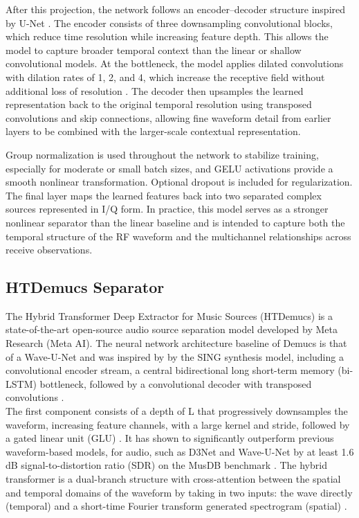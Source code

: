 \documentclass[conference]{IEEEtran}
\begin{document}
After this projection, the network follows an encoder--decoder structure inspired by U-Net \cite{ronneberger2015unet}. The encoder consists of three downsampling convolutional blocks, which reduce time resolution while increasing feature depth. This allows the model to capture broader temporal context than the linear or shallow convolutional models. At the bottleneck, the model applies dilated convolutions with dilation rates of 1, 2, and 4, which increase the receptive field without additional loss of resolution \cite{yu2015dilated}. The decoder then upsamples the learned representation back to the original temporal resolution using transposed convolutions and skip connections, allowing fine waveform detail from earlier layers to be combined with the larger-scale contextual representation.

Group normalization \cite{wu2018groupnorm} is used throughout the network to stabilize training, especially for moderate or small batch sizes, and GELU activations \cite{gelu} provide a smooth nonlinear transformation. Optional dropout is included for regularization. The final layer maps the learned features back into two separated complex sources represented in I/Q form. In practice, this model serves as a stronger nonlinear separator than the linear baseline and is intended to capture both the temporal structure of the RF waveform and the multichannel relationships across receive observations.

\subsection{HTDemucs Separator}
The Hybrid Transformer Deep Extractor for Music Sources (HTDemucs) is a state-of-the-art open-source audio source separation model developed by Meta Research (Meta AI). The neural network architecture baseline of Demucs is that of a Wave-U-Net and was inspired by by the SING synthesis model, including a convolutional encoder stream, a central bidirectional long short-term memory (bi-LSTM) bottleneck, followed by a convolutional decoder with transposed convolutions \cite{defossez2019demucs}.\\

The first component consists of a depth of L that progressively downsamples the waveform, increasing feature channels, with a large kernel and stride, followed by a gated linear unit (GLU) \cite{defossez_demucs_pypi}. It has shown to significantly outperform previous waveform-based models, for audio, such as D3Net and Wave-U-Net by at least 1.6 dB signal-to-distortion ratio (SDR) on the MusDB benchmark \cite{d3net}. The hybrid transformer is a dual-branch structure with cross-attention between the spatial and temporal domains of the waveform by taking in two inputs: the wave directly (temporal) and a short-time Fourier transform generated spectrogram (spatial) \cite{defossez2019demucs}.
\end{document}

